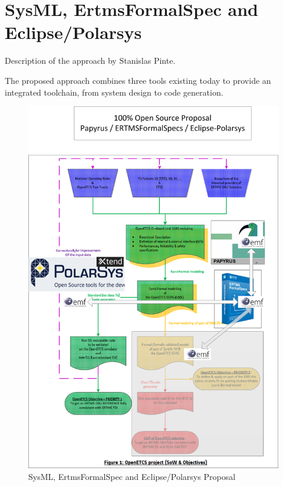 \chapter{SysML, ErtmsFormalSpec and Eclipse/Polarsys}
\label{sec:sysML-EFS}

\begin{todo_comment}
Description of the approach by Stanislas Pinte.
\end{todo_comment}

The proposed approach combines three tools existing today to provide an integrated toolchain, from system design 
to code generation.

\begin{figure}
	\centering
		\includegraphics[width=1.10\textwidth]{images/ERTMSSolutionsAlt_1.png}
		\caption{SysML, ErtmsFormalSpec and Eclipse/Polarsys Proposal}
	\label{fig:ERTMSSolutionsAlt_1}
\end{figure}

